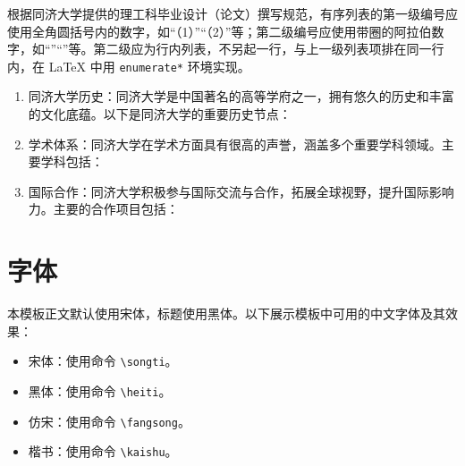 根据同济大学提供的理工科毕业设计（论文）撰写规范，有序列表的第一级编号应使用全角圆括号内的数字，如“（1）”“（2）”等；第二级编号应使用带圈的阿拉伯数字，如“”“”等。第二级应为行内列表，不另起一行，与上一级列表项排在同一行内，在 \LaTeX{} 中用 \texttt{enumerate*} 环境实现。

\begin{enumerate}
    \item 同济大学历史：同济大学是中国著名的高等学府之一，拥有悠久的历史和丰富的文化底蕴。以下是同济大学的重要历史节点：
    \item 学术体系：同济大学在学术方面具有很高的声誉，涵盖多个重要学科领域。主要学科包括：
    \item 国际合作：同济大学积极参与国际交流与合作，拓展全球视野，提升国际影响力。主要的合作项目包括：
\end{enumerate}

\section{字体}

本模板正文默认使用宋体，标题使用黑体。以下展示模板中可用的中文字体及其效果：

\begin{itemize}
    \item {\songti 宋体}：使用命令 \texttt{\textbackslash songti}。
    \item {\heiti 黑体}：使用命令 \texttt{\textbackslash heiti}。
    \item {\fangsong 仿宋}：使用命令 \texttt{\textbackslash fangsong}。
    \item {\kaishu 楷书}：使用命令 \texttt{\textbackslash kaishu}。
\end{itemize}

